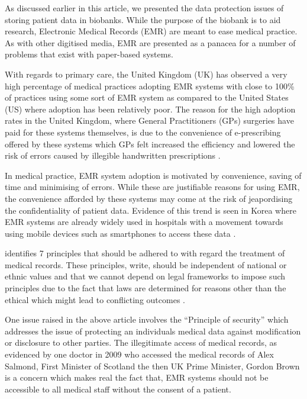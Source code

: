 \documentclass[british,a4paper, 12pt]{article}
\begin{document}
As discussed earlier in this article, we presented the data protection issues of storing
patient data in biobanks. While the purpose of the biobank is to aid research, Electronic
Medical Records (EMR) are meant to ease medical practice. As with other digitised media,
EMR are presented as a panacea for a number of problems that exist with paper-based
systems.

With regards to primary care, the United Kingdom (UK) has observed a very high percentage
of medical practices adopting EMR systems with close to 100\% of practices using some sort
of EMR system as compared to the United States (US) where adoption has been relatively poor.
The reason for the high adoption rates in the United Kingdom, where General Practitioners (GPs)
surgeries have paid for these systems themselves, is due to the convenience of e-prescribing
offered by these systems which GPs felt increased the efficiency and lowered the risk of
errors caused by illegible handwritten prescriptions \cite{schade2006prescribing}.

In medical practice, EMR system adoption is motivated by convenience, saving of time and 
minimising of errors. While these are justifiable reasons for using EMR, the convenience 
afforded by these systems may come at the risk of jeapordising the confidentiality of 
patient data. Evidence of this trend is seen in Korea where EMR systems are already widely 
used in hospitals with a movement towards using mobile devices such as smartphones to 
access these data \parencite{yeo2012pitfalls}.

\citeauthor*{kluge2000professional} identifies 7 principles that should be adhered to
with regard the treatment of medical records. These principles,
\citeauthor*{kluge2000professional} write, should be independent of national or ethnic
values and that we cannot depend on legal frameworks to impose such principles due to
the fact that laws are determined for reasons other than the ethical which might lead to
conflicting outcomes \parencite*{kluge2000professional}.

One issue raised in the above article involves the ``Principle of security'' which
addresses the issue of protecting an individuals medical data against modification or
disclosure to other parties. The illegitimate access of medical records,
as evidenced by one doctor in 2009 who accessed the medical records of Alex Salmond,
First Minister of Scotland the then UK Prime Minister, Gordon Brown
\parencite{dailyrecord2010doctor} is a concern which makes real the fact that, EMR
systems should not be accessible to all medical staff without the consent of a patient.
\end{document}
